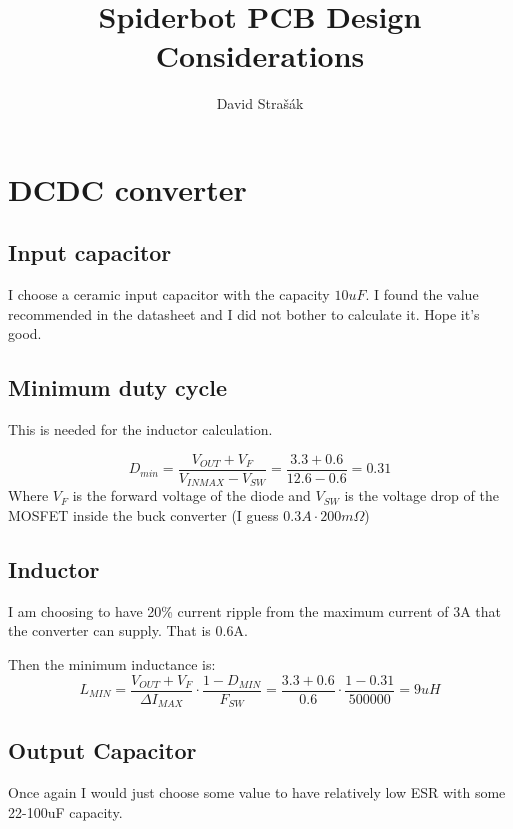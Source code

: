 \documentclass[10pt]{article} %
\title{Spiderbot PCB Design Considerations}
\author{David Strašák}
\begin{document}
	\maketitle
	
	\section{DCDC converter}
	\subsection{Input capacitor}
	I choose a ceramic input capacitor with the capacity $10uF$. I found the value recommended in the datasheet and I did not bother to calculate it. Hope it's good.
	
	\subsection{Minimum duty cycle}
	This is needed for the inductor calculation.
	
	\begin{equation}
		D_{min} = \frac{V_{OUT} + V_F}{V_{INMAX} - V_{SW}} = \frac{3.3 + 0.6}{12.6 - 0.6} = 0.31
	\end{equation}
	Where $V_F$ is the forward voltage of the diode and $V_{SW}$ is the voltage drop of the MOSFET inside the buck converter (I guess $0.3A\cdot{}200m\Omega$)
	
	\subsection{Inductor}
	I am choosing to have 20\% current ripple from the maximum current of 3A that the converter can supply. That is 0.6A.
	
	Then the minimum inductance is:
	\begin{equation}
		L_{MIN} = \frac{V_{OUT} + V_F}{\Delta{}I_{MAX}}\cdot\frac{1-D_{MIN}}{F_{SW}} = \frac{3.3+0.6}{0.6}\cdot\frac{1-0.31}{500 000} = 9uH
	\end{equation}
	
	\subsection{Output Capacitor}
	Once again I would just choose some value to have relatively low ESR with some 22-100uF capacity.
	
	
	
	\printbibliography
	
\end{document}
